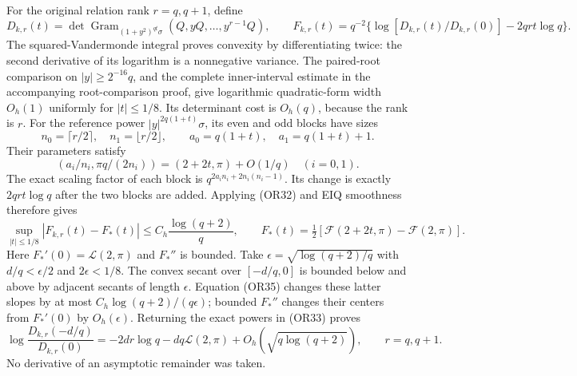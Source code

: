 \documentclass[11pt]{article}
\begin{document}
For the original relation rank \(r=q,q+1\), define
\[
 D_{k,r}(t)=\det\operatorname{Gram}_{(1+y^2)^{qt}\sigma}
                  (Q,yQ,\ldots,y^{r-1}Q),\qquad
 F_{k,r}(t)=q^{-2}\{\log[D_{k,r}(t)/D_{k,r}(0)]
                      -2qrt\log q\}.                \tag{OR33}
\]
The squared-Vandermonde integral proves convexity by
differentiating twice: the second derivative of its logarithm
is a nonnegative variance.  The paired-root comparison on
\(|y|\geq2^{-16}q\), and the complete inner-interval estimate
in the accompanying root-comparison proof, give logarithmic
quadratic-form width \(O_h(1)\) uniformly for \(|t|\leq1/8\).
Its determinant cost is \(O_h(q)\), because the rank is \(r\).
For the reference power \(|y|^{2q(1+t)}\sigma\), its even and
odd blocks have sizes
\[
 n_0=\lceil r/2\rceil,\quad n_1=\lfloor r/2\rfloor,
 \qquad a_0=q(1+t),\quad a_1=q(1+t)+1.
\]
Their parameters satisfy
\[
 (a_i/n_i,\pi q/(2n_i))=(2+2t,\pi)+O(1/q)
 \quad(i=0,1).
 \tag{OR34}
\]
The exact scaling factor of each block is
\(q^{2a_i n_i+2n_i(n_i-1)}\).
Its change is exactly \(2qrt\log q\) after the two blocks
are added.  Applying (OR32) and EIQ smoothness therefore gives
\[
 \sup_{|t|\leq1/8}|F_{k,r}(t)-F_*(t)|
 \leq C_h\frac{\log(q+2)}q,\qquad
 F_*(t)=\tfrac12[\mathcal F(2+2t,\pi)-\mathcal F(2,\pi)] .
 \tag{OR35}
\]
Here \(F_*'(0)=\mathcal L(2,\pi)\) and \(F_*''\) is bounded.
Take \(\epsilon=\sqrt{\log(q+2)/q}\) with
\(d/q<\epsilon/2\) and \(2\epsilon<1/8\).
The convex secant over \([-d/q,0]\) is bounded below and
above by adjacent secants of length \(\epsilon\).
Equation (OR35) changes these latter slopes by at most
\(C_h\log(q+2)/(q\epsilon)\); bounded \(F_*''\) changes their
centers from \(F_*'(0)\) by \(O_h(\epsilon)\).
Returning the exact powers in (OR33) proves
\[
 \log\frac{D_{k,r}(-d/q)}{D_{k,r}(0)}
 =-2dr\log q-dq\mathcal L(2,\pi)
   +O_h(\sqrt{q\log(q+2)}),\qquad r=q,q+1.            \tag{OR36}
\]
No derivative of an asymptotic remainder was taken.
\end{document}
